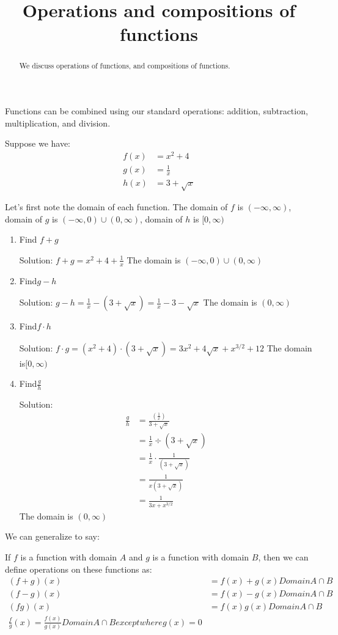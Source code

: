 \documentclass{ximera}
\title{Operations and compositions of functions}
\begin{document}
\begin{abstract}
  We discuss operations of functions, and compositions of functions.
\end{abstract}
\maketitle


Functions can be combined using our standard operations: addition,
subtraction, multiplication, and division.

\begin{example}
Suppose we have: 
\begin{align*}
  f(x) &=x^2+4 \\ 
  g(x) &=\frac{1}{x} \\ 
  h(x) &=3+\sqrt{x}  
\end{align*}

Let's first note the domain of each function.  The domain of $f$ is
$(-\infty ,\infty )$, domain of $g$ is $(-\infty ,0)\cup (0,\infty )$,
domain of $h$ is $[0,\infty)$
\begin{enumerate}
\item Find $f+g$
  
  Solution: $f+g=x^2+4+\frac{1}{x}$  The domain is $(-\infty ,0)\cup (0,\infty )$
\item Find$g-h$ 

  Solution: $g-h=\frac{1}{x}-(3+\sqrt{x})=\frac{1}{x}-3-\sqrt{x}$ The domain is $(0,\infty )$
\item Find$f\cdot h$
  
Solution: $f\cdot g=\left( {{x}^{2}}+4 \right)\cdot \left( 3+\sqrt{x} \right)=3{{x}^{2}}+4\sqrt{x}+{{x}^{3/2}}+12$ The domain is$[0,\infty )$
\item Find$\frac{g}{h}$ 

  Solution:
  \begin{align*}
    \frac{g}{h} &=\frac{\left( \frac{1}{x} \right)}{3+\sqrt{x}}\\
    &=\frac{1}{x}\div \left( 3+\sqrt{x} \right)\\
    &=\frac{1}{x}\cdot \frac{1}{\left( 3+\sqrt{x} \right)}\\
    &=\frac{1}{x\left( 3+\sqrt{x} \right)}\\
    &=\frac{1}{3x+{{x}^{3/2}}}
  \end{align*}
  The domain is $(0,\infty )$
\end{enumerate}
\end{example}

We can generalize to say:
\begin{definition}
If $f$ is a function with domain $A$ and $g$ is a function with domain $B$, then we can define operations on these functions as:
\begin{align*}
(f+g)(x) &=f(x)+g(x) Domain A \cap B\\
(f-g)(x) &=f(x)-g(x)  Domain A \cap B\\
(fg)(x) &=f(x)g(x)  Domain A \cap B\\
\frac{f}{g}(x) = \frac{f(x)}{g(x)} Domain A \cap B except where g(x)=0
\end{align*}
\end{definition}
\end{document}

